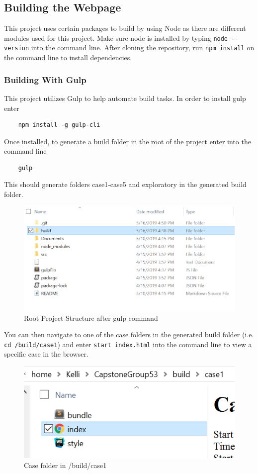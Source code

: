 \subsection{Building the Webpage}
This project uses certain packages to build by using Node as there are different modules used for this project. Make sure node is installed by typing \lstinline{node --version} into the command line. After cloning the repository, run 
\lstinline[columns=fixed]{npm install}
on the command line to install dependencies.
\subsubsection{Building With Gulp}
This project utilizes Gulp to help automate build tasks. In order to install gulp enter
\begin{lstlisting}
    npm install -g gulp-cli
\end{lstlisting}
Once installed, to generate a build folder in the root of the project enter into the command line
\begin{lstlisting}
    gulp
\end{lstlisting}

\noindent This should generate folders case1-case5 and exploratory in the generated build folder. 

\begin{figure}[H]
  \includegraphics{subfiles/build.PNG}
  \caption{Root Project Structure after gulp command}
  \label{fig:Project}
\end{figure}

\noindent You can then navigate to one of the case folders in the generated build folder (i.e. \lstinline{cd /build/case1}) and enter \lstinline{start index.html} into the command line to view a specific case in the browser.

\begin{figure}[H]
\includegraphics{subfiles/build-case1.PNG}
  \caption{Case folder in /build/case1}
  \label{fig:Case1}
\end{figure}


